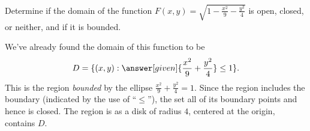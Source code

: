 \documentclass{ximera}
\begin{document}


\begin{example}
  Determine if the domain of the function
  $F(x,y)=\sqrt{1-\frac{x^2}9-\frac{y^2}4}$ is open, closed, or
  neither, and if it is bounded.
  \begin{explanation}
    We've already found the domain of this function to be
    \[
    D = \{(x,y): \answer[given]{\frac{x^2}9+\frac{y^2}4}\leq 1\}.
    \]
    This is the region \textit{bounded} by the ellipse
    $\frac{x^2}9+\frac{y^2}4=1$. Since the region includes the
    boundary (indicated by the use of ``$\leq$''), the set
    all of its boundary points and hence is closed. The region is
     as a disk
    of radius $4$, centered at the origin, contains $D$.
  \end{explanation}
\end{example}
\end{document}
